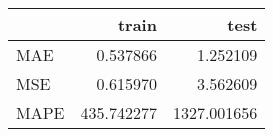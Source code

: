 \begin{tabular}{lrr}
\toprule
{} &       train &         test \\
\midrule
MAE  &    0.537866 &     1.252109 \\
MSE  &    0.615970 &     3.562609 \\
MAPE &  435.742277 &  1327.001656 \\
\bottomrule
\end{tabular}
